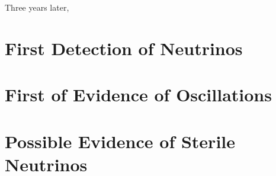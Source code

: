  Three years later, 

\section{First Detection of Neutrinos}

\section{First of Evidence of Oscillations}

\section{Possible Evidence of Sterile Neutrinos}




